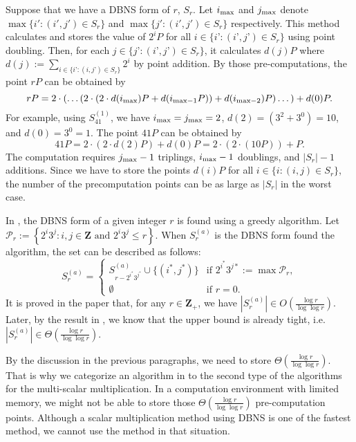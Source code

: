 Suppose that we have a DBNS form of $r$, $S_r$. Let $i_{\rm max}$ and $j_{\rm max}$ denote $\max\{ i' : (i',j') \in S_r \}$ and $\max\{ j' : (i',j') \in S_r \}$ respectively.
This method calculates and stores the value of $2^iP$ for all $i \in \{i’ : (i’, j’) \in S_r \}$ using point doubling.
Then, for each $j \in \{j’ : (i’, j’) \in S_r \}$, it calculates $d(j)P$ where $d(j) := \sum\limits_{i \in \{i’ : (i,j’) \in S_r\}} 2^i $ by point addition.
By those pre-computations, the point $rP$ can be obtained by
$$rP = 2\cdot \left( \dots \left( 2 \cdot \left( 2 \cdot d(i_{\rm max})P + d(i_{\mathrm{max} - 1}P) \right) + d(i_{\mathrm{max} - 2})P \right) \dots \right) + d(0)P.$$
For example, using $S_{41}^{(1)}$, we have $i_{\rm max} = j_{\rm max} = 2$, $d(2) = \left(3^2 + 3^0\right) = 10$, and $d(0) =  3^0 = 1$. The point $41P$ can be obtained by
$$41P = 2 \cdot \left( 2 \cdot d(2)P  \right) + d(0)P = 2 \cdot \left( 2 \cdot \left( 10P \right)  \right) + P.$$
The computation requires $j_{\rm max} - 1$ triplings, $i_{\rm max} - 1$ doublings, and $|S_r| - 1$ additions.
Since we have to store the points $d(i)P$ for all $i \in \{i : (i,j) \in S_r\}$, the number of the precomputation points can be as large as $|S_r|$ in the worst case.

In \cite{dbns2}, the DBNS form of a given integer $r$ is found using a greedy algorithm. Let $\mathcal{P}_r := \left\{ 2^i3^j : i,j \in \mathbf{Z} \text{ and } 2^i3^j \leq r \right\}$. When $S^{(a)}_r$ is the DBNS form found the algorithm, the set can be described as follows:
\[
S^{(a)}_r =
\begin{cases}
S^{(a)}_{r - 2^{i^*}3^{j^*}} \cup \{(i^*, j^*)\} & \text{if } 2^{i^*}3^{j*} := \max \mathcal{P}_r, \\
\emptyset       & \text{if } r = 0.
\end{cases}
\]
It is proved in the paper that, for any $r \in \mathbf{Z}_+$, we have $\left|S_r^{(a)}\right| \in O(\frac{\log r}{\log \log r})$. Later, by the result in \cite{dbns3}, we know that the upper bound is already tight, i.e. $\left|S_r^{(a)}\right| \in \Theta(\frac{\log r}{\log \log r})$.

By the discussion in the previous paragraphs, we need to store $\Theta(\frac{\log r}{\log \log r})$. That is why we categorize an algorithm in \cite{dbns} to the second type of the algorithms for the multi-scalar multiplication. In a computation environment with limited memory, we might not be able to store those $\Theta(\frac{\log r}{\log \log r})$ pre-computation points. Although a scalar multiplication method using DBNS is one of the fastest method, we cannot use the method in that situation.

